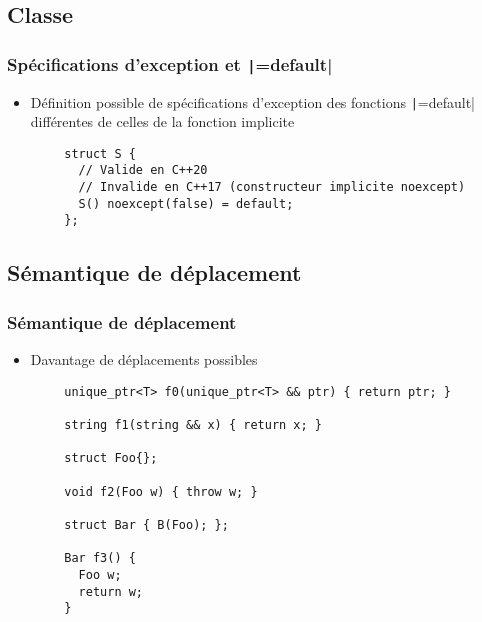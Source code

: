 \documentclass[C++.tex]{subfiles}
\begin{document}
\subsection*{Classe}
\begin{frame}[fragile]
	\frametitle{Spécifications d'exception et \texttt|=default|}
	\begin{itemize}
		\item Définition possible de spécifications d'exception des fonctions \texttt|=default| différentes de celles de la fonction implicite
	\end{itemize}

	\begin{verbatim}
		struct S {
		  // Valide en C++20
		  // Invalide en C++17 (constructeur implicite noexcept)
		  S() noexcept(false) = default;
		};
	\end{verbatim}

\end{frame}

\subsection*{Sémantique de déplacement}
\begin{frame}[fragile]
	\frametitle{Sémantique de déplacement}
	\begin{itemize}
		\item Davantage de déplacements possibles
	\end{itemize}

	\begin{verbatim}
		unique_ptr<T> f0(unique_ptr<T> && ptr) { return ptr; }

		string f1(string && x) { return x; }

		struct Foo{};

		void f2(Foo w) { throw w; }

		struct Bar { B(Foo); };

		Bar f3() {
		  Foo w;
		  return w;
		}
	\end{verbatim}


\end{frame}
\end{document}
